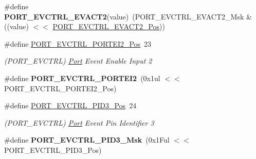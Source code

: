 \begin{DoxyCompactItemize}
\item 
\hypertarget{group___s_a_m_l21___p_o_r_t_ga47671c947ce8e1e769f47b5555d8d947}{}\#define {\bfseries P\+O\+R\+T\+\_\+\+E\+V\+C\+T\+R\+L\+\_\+\+E\+V\+A\+C\+T2}(value)~(P\+O\+R\+T\+\_\+\+E\+V\+C\+T\+R\+L\+\_\+\+E\+V\+A\+C\+T2\+\_\+\+Msk \& ((value) $<$$<$ \hyperlink{group___s_a_m_l21___p_o_r_t_gacd45d1b50592f003b3d9e42a85132211}{P\+O\+R\+T\+\_\+\+E\+V\+C\+T\+R\+L\+\_\+\+E\+V\+A\+C\+T2\+\_\+\+Pos}))\label{group___s_a_m_l21___p_o_r_t_ga47671c947ce8e1e769f47b5555d8d947}

\item 
\hypertarget{group___s_a_m_l21___p_o_r_t_ga5314beeda2b4a48292ede491bf20d093}{}\#define \hyperlink{group___s_a_m_l21___p_o_r_t_ga5314beeda2b4a48292ede491bf20d093}{P\+O\+R\+T\+\_\+\+E\+V\+C\+T\+R\+L\+\_\+\+P\+O\+R\+T\+E\+I2\+\_\+\+Pos}~23\label{group___s_a_m_l21___p_o_r_t_ga5314beeda2b4a48292ede491bf20d093}

\begin{DoxyCompactList}\small\item\em (P\+O\+R\+T\+\_\+\+E\+V\+C\+T\+R\+L) \hyperlink{struct_port}{Port} Event Enable Input 2 \end{DoxyCompactList}\item 
\hypertarget{group___s_a_m_l21___p_o_r_t_ga92499272df8129b33c5a677d41d79a51}{}\#define {\bfseries P\+O\+R\+T\+\_\+\+E\+V\+C\+T\+R\+L\+\_\+\+P\+O\+R\+T\+E\+I2}~(0x1ul $<$$<$ P\+O\+R\+T\+\_\+\+E\+V\+C\+T\+R\+L\+\_\+\+P\+O\+R\+T\+E\+I2\+\_\+\+Pos)\label{group___s_a_m_l21___p_o_r_t_ga92499272df8129b33c5a677d41d79a51}

\item 
\hypertarget{group___s_a_m_l21___p_o_r_t_gac60f3d827e52d29afc68baf448f3133b}{}\#define \hyperlink{group___s_a_m_l21___p_o_r_t_gac60f3d827e52d29afc68baf448f3133b}{P\+O\+R\+T\+\_\+\+E\+V\+C\+T\+R\+L\+\_\+\+P\+I\+D3\+\_\+\+Pos}~24\label{group___s_a_m_l21___p_o_r_t_gac60f3d827e52d29afc68baf448f3133b}

\begin{DoxyCompactList}\small\item\em (P\+O\+R\+T\+\_\+\+E\+V\+C\+T\+R\+L) \hyperlink{struct_port}{Port} Event Pin Identifier 3 \end{DoxyCompactList}\item 
\hypertarget{group___s_a_m_l21___p_o_r_t_gac1775be3c8bdf4a2b12bec995200547d}{}\#define {\bfseries P\+O\+R\+T\+\_\+\+E\+V\+C\+T\+R\+L\+\_\+\+P\+I\+D3\+\_\+\+Msk}~(0x1\+Ful $<$$<$ P\+O\+R\+T\+\_\+\+E\+V\+C\+T\+R\+L\+\_\+\+P\+I\+D3\+\_\+\+Pos)\label{group___s_a_m_l21___p_o_r_t_gac1775be3c8bdf4a2b12bec995200547d}


\end{DoxyCompactItemize}
